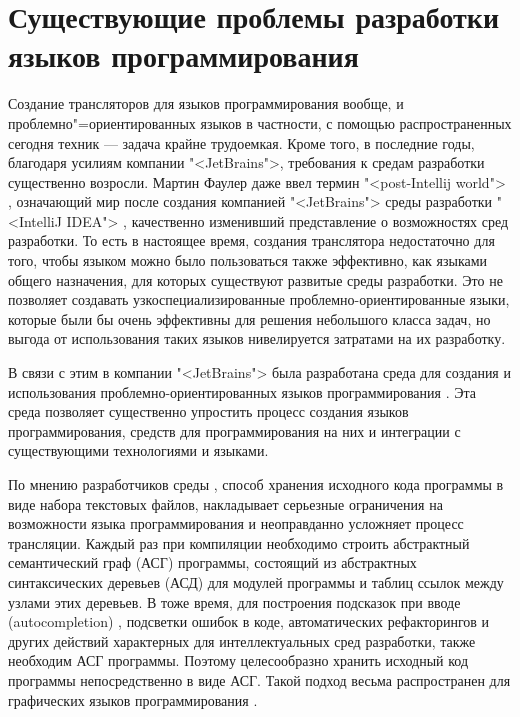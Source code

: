 \section{Существующие проблемы разработки языков программирования}
Создание трансляторов для языков программирования вообще, и проблемно"=ориентированных языков в частности, с помощью распространенных сегодня техник \cite{redDragon}
--- задача крайне трудоемкая. Кроме того, в последние годы, благодаря усилиям компании "<JetBrains">, требования к средам
разработки существенно возросли. Мартин Фаулер даже ввел термин "<post-Intellij world"> \cite{fowler01}, означающий мир
после создания компанией "<JetBrains"> среды разработки "<IntelliJ IDEA"> \cite{intellijIDEA1,intellijIDEA2}, качественно
изменивший представление о возможностях сред разработки. То есть в настоящее время, создания транслятора недостаточно для
того, чтобы языком можно было пользоваться также эффективно, как языками общего назначения, для которых существуют развитые
среды разработки. Это не позволяет создавать узкоспециализированные проблемно-ориентированные языки, которые были бы очень
эффективны для решения небольшого класса задач, но выгода от использования таких языков нивелируется затратами на их
разработку.

В связи с этим в компании "<JetBrains"> была разработана среда для создания и использования проблемно-ориентированных языков
программирования \MPS{} \cite{dmitriev,fowler02}. Эта среда позволяет существенно упростить процесс создания языков
программирования, средств для программирования на них и интеграции с существующими технологиями и языками.

По мнению разработчиков среды \MPS{}, способ хранения исходного кода программы в виде набора текстовых файлов, накладывает
серьезные ограничения на возможности языка программирования и неоправданно усложняет процесс трансляции. Каждый раз при
компиляции необходимо строить абстрактный семантический граф (АСГ) 
программы, состоящий из
абстрактных синтаксических деревьев (АСД) 
для модулей программы и таблиц ссылок между узлами этих деревьев. В
тоже время, для построения подсказок при вводе (autocompletion) \cite{myAutocompletion}, подсветки ошибок в коде,
автоматических рефакторингов \cite{fowler03} и других действий характерных для  интеллектуальных сред разработки, также
необходим АСГ программы. Поэтому целесообразно хранить исходный код программы непосредственно в виде АСГ.
Такой подход весьма распространен для графических языков программирования \cite{myUMLSwitchEclipse,gmf,msdsl}.


